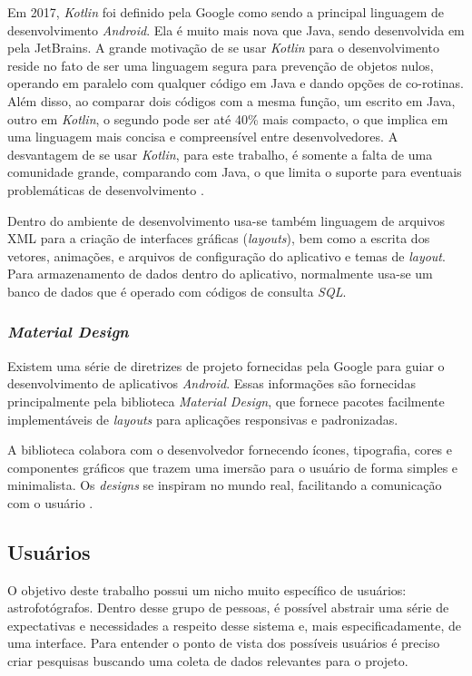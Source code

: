 Em 2017, \textit{Kotlin} foi definido pela Google como sendo a principal linguagem de desenvolvimento \textit{Android}. Ela é muito mais nova que Java, sendo desenvolvida em pela JetBrains. A grande motivação de se usar \textit{Kotlin} para o desenvolvimento reside no fato de ser uma linguagem segura para prevenção de objetos nulos, operando em paralelo com qualquer código em Java e dando opções de co-rotinas. Além disso, ao comparar dois códigos com a mesma função, um escrito em Java, outro em \textit{Kotlin}, o segundo pode ser até 40\% mais compacto, o que implica em uma linguagem mais concisa e compreensível entre desenvolvedores. A desvantagem de se usar \textit{Kotlin}, para este trabalho, é somente a falta de uma comunidade grande, comparando com Java, o que limita o suporte para eventuais problemáticas de desenvolvimento \cite{site:kotlinxjava}.

Dentro do ambiente de desenvolvimento usa-se também linguagem de arquivos XML para a criação de interfaces gráficas (\textit{layouts}), bem como a escrita dos vetores, animações, e arquivos de configuração do aplicativo e temas de \textit{layout}. Para armazenamento de dados dentro do aplicativo, normalmente usa-se um banco de dados que é operado com códigos de consulta \textit{SQL}.

\subsubsection{\textit{Material Design}}
Existem uma série de diretrizes de projeto fornecidas pela Google para guiar o desenvolvimento de aplicativos \textit{Android}. Essas informações são fornecidas principalmente pela biblioteca \textit{Material Design}, que fornece pacotes facilmente implementáveis de \textit{layouts} para aplicações responsivas e padronizadas.

A biblioteca colabora com o desenvolvedor fornecendo ícones, tipografia, cores e componentes gráficos que trazem uma imersão para o usuário de forma simples e minimalista. Os \textit{designs} se inspiram no mundo real, facilitando a comunicação com o usuário \cite{site:materialdesign}.

\subsection{Usuários}

O objetivo deste trabalho possui um nicho muito específico de usuários: astrofotógrafos. Dentro desse grupo de pessoas, é possível abstrair uma série de expectativas e necessidades a respeito desse sistema e, mais especificadamente, de uma interface. Para entender o ponto de vista dos possíveis usuários é preciso criar pesquisas buscando uma coleta de dados relevantes para o projeto. 

